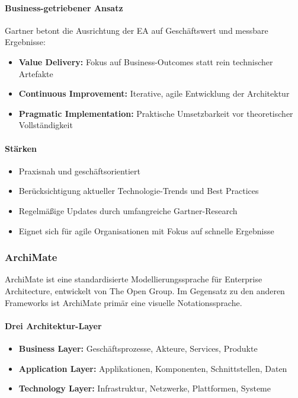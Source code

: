 \paragraph{Business-getriebener Ansatz}
Gartner betont die Ausrichtung der EA auf Geschäftswert und messbare Ergebnisse:
\begin{itemize}
\item \textbf{Value Delivery:} Fokus auf Business-Outcomes statt rein technischer Artefakte
\item \textbf{Continuous Improvement:} Iterative, agile Entwicklung der Architektur
\item \textbf{Pragmatic Implementation:} Praktische Umsetzbarkeit vor theoretischer Vollständigkeit
\end{itemize}

\paragraph{Stärken}
\begin{itemize}
\item Praxisnah und geschäftsorientiert
\item Berücksichtigung aktueller Technologie-Trends und Best Practices
\item Regelmäßige Updates durch umfangreiche Gartner-Research
\item Eignet sich für agile Organisationen mit Fokus auf schnelle Ergebnisse
\end{itemize}

\subsubsection{ArchiMate}
\label{subsubsec:archimate}

ArchiMate ist eine standardisierte Modellierungssprache für Enterprise Architecture, entwickelt von The Open Group. Im Gegensatz zu den anderen Frameworks ist ArchiMate primär eine visuelle Notationssprache.

\paragraph{Drei Architektur-Layer}
\begin{itemize}
\item \textbf{Business Layer:} Geschäftsprozesse, Akteure, Services, Produkte
\item \textbf{Application Layer:} Applikationen, Komponenten, Schnittstellen, Daten
\item \textbf{Technology Layer:} Infrastruktur, Netzwerke, Plattformen, Systeme
\end{itemize}

